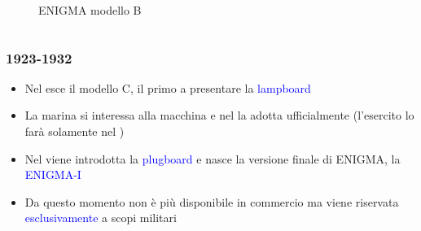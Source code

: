 \begin{frame}
\begin{columns}
\begin{column}{0.45\textwidth}
\begin{figure}
					\caption{ENIGMA modello B}
				\end{figure}
			\end{column}
		\end{columns}		
	\end{frame}
	
	\begin{frame}
		\frametitle{1923-1932}		
		\begin{itemize}
			\item Nel  esce il modello C, il primo a presentare la \textcolor{blue}{lampboard}
			\item La marina si interessa alla macchina e nel  la adotta ufficialmente (l'esercito lo farà solamente nel )
			\item Nel  viene introdotta la \textcolor{blue}{plugboard} e nasce la versione finale di ENIGMA, la \textcolor{blue}{ENIGMA-I}
			\item Da questo momento non è più disponibile in commercio ma viene riservata \textcolor{blue}{esclusivamente} a scopi militari
		\end{itemize}
	\end{frame}
	
